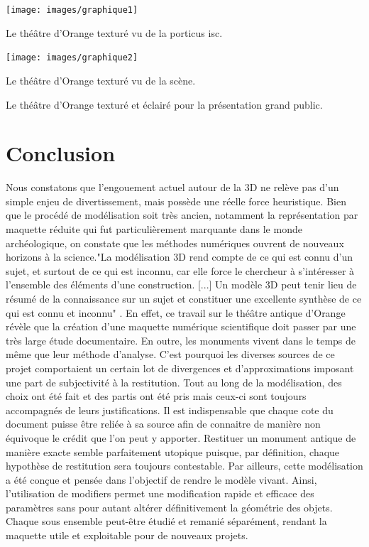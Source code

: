  \begin{figureth}
	\begin{subfigureth}{\textwidth}
		\texttt{[image: images/graphique1]}
	\caption{Le théâtre d'Orange texturé vu de la \gls{porticus isc}.} 
	\end{subfigureth}	
	\vspace{1cm}
	\begin{subfigureth}{\textwidth}
		\texttt{[image: images/graphique2]}
		\caption{Le théâtre d'Orange texturé vu de la scène.} 		
	\end{subfigureth}	
	\caption{Le théâtre d'Orange texturé et éclairé pour la présentation grand public.}
	\label{theatretexture}
\end{figureth}


		
		
\chapter*{Conclusion}

Nous constatons que l'engouement actuel autour de la 3D ne relève pas d'un simple enjeu de divertissement, mais possède une réelle force heuristique. Bien que le procédé de modélisation soit très ancien, notamment la représentation par maquette réduite qui fut particulièrement marquante dans le monde archéologique, on constate que les méthodes numériques ouvrent de nouveaux horizons à la science."La modélisation 3D rend compte de ce qui est connu d’un sujet, et surtout de ce qui est inconnu, car elle force le chercheur à s’intéresser à l’ensemble des éléments d’une construction. [...] Un modèle 3D peut tenir lieu de résumé de la connaissance sur un sujet et constituer une excellente synthèse de ce qui est connu et inconnu" \cite[p. 249]{rocheleau}. En effet, ce travail sur le théâtre antique d'Orange révèle que la création d'une maquette numérique scientifique doit passer par une très large étude documentaire. En outre, les monuments vivent dans le temps de même que leur méthode d'analyse. C'est pourquoi les diverses sources de ce projet comportaient un certain lot de divergences et d'approximations imposant une part de subjectivité à la restitution. Tout au long de la modélisation, des choix ont été fait et des partis ont été pris mais ceux-ci sont toujours accompagnés de leurs justifications. Il est indispensable que chaque cote du document puisse être reliée à sa source afin de connaitre de manière non équivoque le crédit que l'on peut y apporter. Restituer un monument antique de manière exacte semble parfaitement utopique puisque, par définition, chaque hypothèse de restitution sera toujours contestable.
Par ailleurs, cette modélisation a été conçue et pensée dans l'objectif de rendre le modèle vivant. Ainsi, l'utilisation de \glspl{modifier} permet une modification rapide et efficace des paramètres sans pour autant altérer définitivement la géométrie des objets. Chaque sous ensemble peut-être étudié et remanié séparément, rendant la maquette utile et exploitable pour de nouveaux projets.


